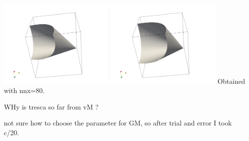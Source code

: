 \begin{center}
\includegraphics[width=5.7cm]{python_codes/fieldstone_159/images/DPm}
\includegraphics[width=5.7cm]{python_codes/fieldstone_159/images/DPc}
{\captionfont Obtained with nnx=80}.
\end{center}

WHy is tresca so far from vM ?

not sure how to choose the parameter for GM, so after trial and error I took c/20.


